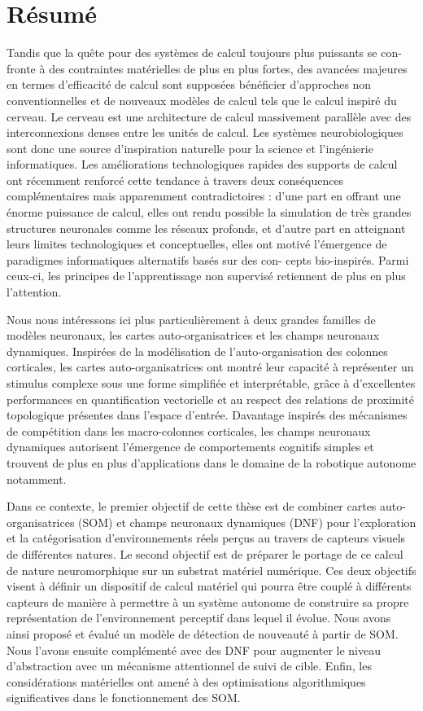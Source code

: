 \chapter*{Résumé}
\markboth{}{}

Tandis que la quête pour des systèmes de calcul toujours plus puissants se con- fronte à des contraintes matérielles de plus en plus fortes, des avancées majeures en termes d’efficacité de calcul sont supposées bénéficier d’approches non conventionnelles et de nouveaux modèles de calcul tels que le calcul inspiré du cerveau. Le cerveau est une architecture de calcul massivement parallèle avec des interconnexions denses entre les unités de calcul. Les systèmes neurobiologiques sont donc une source d'inspiration naturelle pour la science et l'ingénierie informatiques. Les améliorations technologiques rapides des supports de calcul ont récemment renforcé cette tendance à travers deux conséquences complémentaires mais apparemment contradictoires : d’une part en offrant une énorme puissance de calcul, elles ont rendu possible la simulation de très grandes structures neuronales comme les réseaux profonds, et d’autre part en atteignant leurs limites technologiques et conceptuelles, elles ont motivé l'émergence de paradigmes informatiques alternatifs basés sur des con- cepts bio-inspirés. Parmi ceux-ci, les principes de l’apprentissage non supervisé retiennent de plus en plus l’attention. 

Nous nous intéressons ici plus particulièrement à deux grandes familles de modèles neuronaux, les cartes auto-organisatrices et les champs neuronaux dynamiques. Inspirées de la modélisation de l’auto-organisation des colonnes corticales, les cartes auto-organisatrices ont montré leur capacité à représenter un stimulus complexe sous une forme simplifiée et interprétable, grâce à d’excellentes performances en quantification vectorielle et au respect des relations de proximité topologique présentes dans l’espace d’entrée. Davantage inspirés des mécanismes de compétition dans les macro-colonnes corticales, les champs neuronaux dynamiques autorisent l’émergence de comportements cognitifs simples et trouvent de plus en plus d’applications dans le domaine de la robotique autonome notamment.

Dans ce contexte, le premier objectif de cette thèse est de combiner cartes auto-organisatrices (SOM) et champs neuronaux dynamiques (DNF) pour l’exploration et la catégorisation d’environnements réels perçus au travers de capteurs visuels de différentes natures. Le second objectif est de préparer le portage de ce calcul de nature neuromorphique sur un substrat matériel numérique. Ces deux objectifs visent à définir un dispositif de calcul matériel qui pourra être couplé à différents capteurs de manière à permettre à un système autonome de construire sa propre représentation de l’environnement perceptif dans lequel il évolue. Nous avons ainsi proposé et évalué un modèle de détection de nouveauté à partir de SOM. Nous l'avons ensuite complémenté avec des DNF pour augmenter le niveau d'abstraction avec un mécanisme attentionnel de suivi de cible. Enfin, les considérations matérielles ont amené à des optimisations algorithmiques significatives dans le fonctionnement des SOM.

